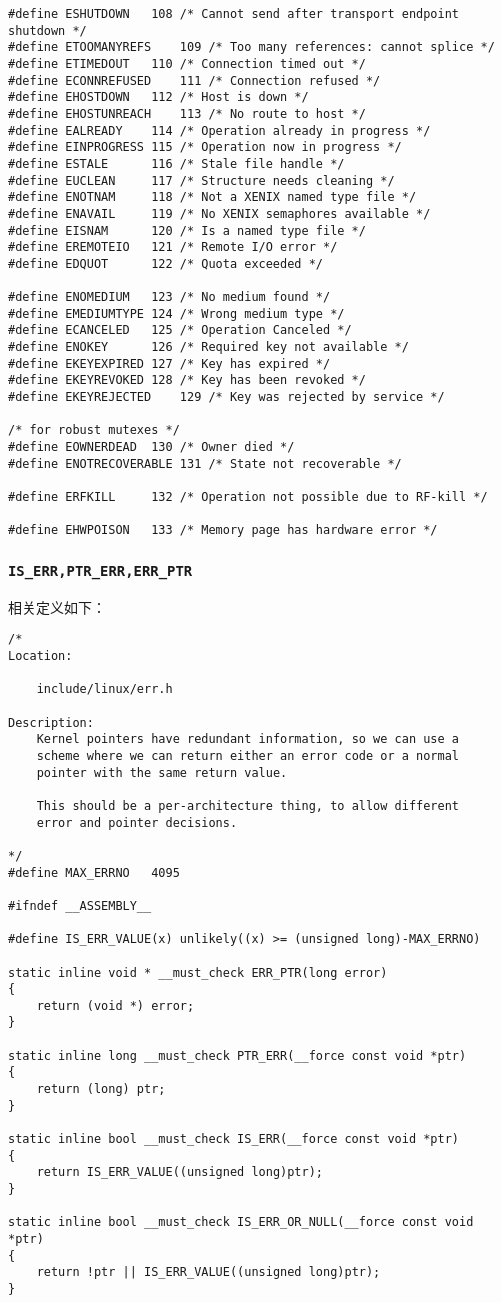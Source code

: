 \begin{verbatim}
#define	ESHUTDOWN	108	/* Cannot send after transport endpoint shutdown */
#define	ETOOMANYREFS	109	/* Too many references: cannot splice */
#define	ETIMEDOUT	110	/* Connection timed out */
#define	ECONNREFUSED	111	/* Connection refused */
#define	EHOSTDOWN	112	/* Host is down */
#define	EHOSTUNREACH	113	/* No route to host */
#define	EALREADY	114	/* Operation already in progress */
#define	EINPROGRESS	115	/* Operation now in progress */
#define	ESTALE		116	/* Stale file handle */
#define	EUCLEAN		117	/* Structure needs cleaning */
#define	ENOTNAM		118	/* Not a XENIX named type file */
#define	ENAVAIL		119	/* No XENIX semaphores available */
#define	EISNAM		120	/* Is a named type file */
#define	EREMOTEIO	121	/* Remote I/O error */
#define	EDQUOT		122	/* Quota exceeded */

#define	ENOMEDIUM	123	/* No medium found */
#define	EMEDIUMTYPE	124	/* Wrong medium type */
#define	ECANCELED	125	/* Operation Canceled */
#define	ENOKEY		126	/* Required key not available */
#define	EKEYEXPIRED	127	/* Key has expired */
#define	EKEYREVOKED	128	/* Key has been revoked */
#define	EKEYREJECTED	129	/* Key was rejected by service */

/* for robust mutexes */
#define	EOWNERDEAD	130	/* Owner died */
#define	ENOTRECOVERABLE	131	/* State not recoverable */

#define ERFKILL		132	/* Operation not possible due to RF-kill */

#define EHWPOISON	133	/* Memory page has hardware error */
\end{verbatim}
			\subsubsection{\texttt{IS_ERR,PTR_ERR,ERR_PTR}}

				相关定义如下：
\begin{verbatim}
/*
Location:

	include/linux/err.h

Description:
 	Kernel pointers have redundant information, so we can use a
	scheme where we can return either an error code or a normal
	pointer with the same return value.

	This should be a per-architecture thing, to allow different
	error and pointer decisions.

*/
#define MAX_ERRNO	4095

#ifndef __ASSEMBLY__

#define IS_ERR_VALUE(x) unlikely((x) >= (unsigned long)-MAX_ERRNO)

static inline void * __must_check ERR_PTR(long error)
{
	return (void *) error;
}

static inline long __must_check PTR_ERR(__force const void *ptr)
{
	return (long) ptr;
}

static inline bool __must_check IS_ERR(__force const void *ptr)
{
	return IS_ERR_VALUE((unsigned long)ptr);
}

static inline bool __must_check IS_ERR_OR_NULL(__force const void *ptr)
{
	return !ptr || IS_ERR_VALUE((unsigned long)ptr);
}
\end{verbatim}


